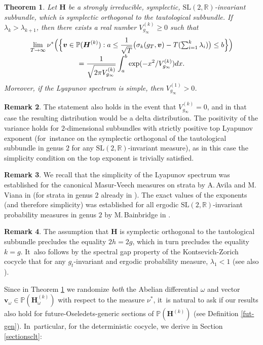 \documentclass[10pt]{amsart}
\theoremstyle{plain}
\newtheorem{thm}{Theorem}[section]
\theoremstyle{definition}
\newtheorem{rem}[thm]{Remark}
\numberwithin{equation}{subsection}
\newcommand\bP{\mathbb{P}}
\newcommand\bR{\mathbb{R}}\let\R\bR
\newcommand{\SL}{\mathrm{SL}}
\newcommand{\bfH}{\boldsymbol{H}}
\newcommand{\bfv}{\boldsymbol{v}}
\begin{document}
\begin{thm}\label{dclt}
Let $\bfH$ be a strongly irreducible, symplectic, $\SL(2,\R)$-invariant subbundle, which is symplectic orthogonal to the tautological subbundle. If $\lambda_k > \lambda_{k+1}$, then there exists a real number $V^{(k)}_{g_\infty} \geq 0$ such that\vspace*{-3pt}
\begin{multline*}
\lim_{T\to\infty}\nu^*\Bigl(\Bigl\{\bfv\in \bP(\bfH^{(k)}) :a \leq \frac{1}{\sqrt{T}} \bigl(\sigma_k(g_{T}, \bfv)- T(\textstyle\sum_{i=1}^k \lambda_i) \bigr) \leq b\Bigr\}\Bigr)\\[-3pt]
= \frac{1}{\sqrt{2\pi V^{(k)}_{g_\infty}}}\int_a^b\exp(-x^2/ V^{(k)}_{g_\infty})dx.
\end{multline*}
Moreover, if the Lyapunov spectrum is simple, then $V^{(1)}_{g_\infty} > 0$.
\end{thm}

\begin{rem}
The statement also holds in the event that $V^{(k)}_{g_\infty} = 0$, and in that case the resulting distribution would be a delta distribution. The positivity of the variance holds for $2$-dimensional subbundles with strictly positive top Lyapunov exponent (for~instance on the symplectic orthogonal of the tautological subbundle in genus $2$ for any $\SL(2,\R)$-invariant measure), as in this case the simplicity condition on the top exponent is trivially satisfied.
\end{rem}
\begin{rem}
We recall that the simplicity of the Lyapunov spectrum was established for the canonical Masur-Veech measures on strata by A.\,Avila and M.\,Viana in \cite{AV07} (for strata in genus $2$ already in \cite{For02}). The exact values of the exponents (and therefore simplicity) was established for all ergodic $\SL(2,\bR)$-invariant probability measures in genus $2$ by M.\,Bainbridge in \cite{B07}.
\end{rem}
\begin{rem}
The assumption that $\bfH$ is symplectic orthogonal to the tautological subbundle precludes the equality $2h=2g$, which in turn precludes the equality $k = g$. It~also follows by the spectral gap property of the Kontsevich-Zorich cocycle that for any $g_t$-invariant and ergodic probability measure, $\lambda_1<1$ \cite{For02} (see also \cite[Cor.\,2.2]{FMZ12}).
\end{rem}

Since in Theorem \ref{dclt} we randomize \emph{both} the Abelian differential $\omega$ and vector $\bfv_\omega \in \bP(\bfH_\omega^{(k)})$ with respect to the measure $\nu^*$, it~is natural to ask if our results also hold for future-Oseledets-generic sections of $\bP(\bfH^{(k)})$ (see Definition \ref{fut-gen}). In~particular, for the deterministic cocycle, we derive in Section \ref{sectionsclt}:
\end{document}
